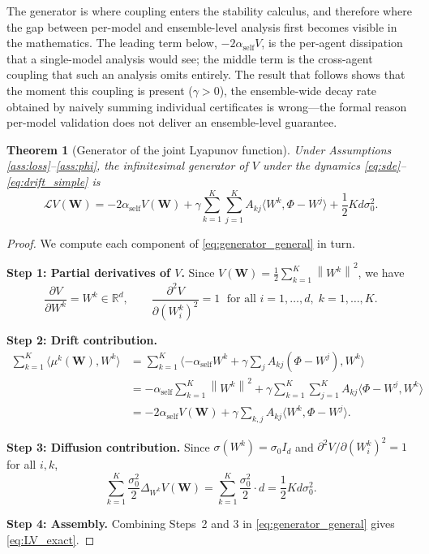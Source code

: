\documentclass[12pt]{article}
\theoremstyle{plain}
\newtheorem{theorem}{Theorem}[section]
\theoremstyle{definition}
\newcommand{\R}{\mathbb{R}}
\newcommand{\Lgen}{\mathcal{L}}
\newcommand{\W}{\mathbf{W}}
\newcommand{\norm}[1]{\left\lVert #1 \right\rVert}
\newcommand{\ip}[2]{\langle #1, #2 \rangle}
\begin{document}
The generator is where coupling enters the stability calculus, and therefore where the gap between per-model and ensemble-level analysis first becomes visible in the mathematics. The leading term below, $-2\alpha_{\mathrm{self}}V$, is the per-agent dissipation that a single-model analysis would see; the middle term is the cross-agent coupling that such an analysis omits entirely. The result that follows shows that the moment this coupling is present ($\gamma>0$), the ensemble-wide decay rate obtained by naively summing individual certificates is wrong---the formal reason per-model validation does not deliver an ensemble-level guarantee.

\begin{theorem}[Generator of the joint Lyapunov function]
  \label{thm:generator}
  Under Assumptions \ref{ass:loss}--\ref{ass:phi}, the infinitesimal
  generator of $V$ under the dynamics \eqref{eq:sde}--\eqref{eq:drift_simple} is
  \begin{equation}
    \Lgen V(\W) = -2\alpha_{\mathrm{self}} V(\W) +
    \gamma \sum_{k=1}^K \sum_{j=1}^K A_{kj}
    \ip{W^k}{\Phi - W^j}
    + \frac{1}{2} K d \sigma_0^2.
    \label{eq:LV_exact}
  \end{equation}
\end{theorem}

\begin{proof}
  We compute each component of \eqref{eq:generator_general} in turn.

  \textbf{Step 1: Partial derivatives of $V$.}
  Since $V(\W) = \tfrac{1}{2}\sum_{k=1}^K \norm{W^k}^2$, we have
  \[
    \frac{\partial V}{\partial W^k} = W^k \in \R^d,
    \qquad
    \frac{\partial^2 V}{\partial (W^k_i)^2} = 1
    \;\text{ for all } i = 1,\ldots,d,\; k = 1,\ldots,K.
  \]

  \textbf{Step 2: Drift contribution.}
  \begin{align*}
    \sum_{k=1}^K \ip{\mu^k(\W)}{W^k}
    &= \sum_{k=1}^K \ip{-\alpha_{\mathrm{self}} W^k
      + \gamma \textstyle\sum_j A_{kj}(\Phi - W^j)}{W^k} \\
    &= -\alpha_{\mathrm{self}} \sum_{k=1}^K \norm{W^k}^2
      + \gamma \sum_{k=1}^K \sum_{j=1}^K A_{kj}
        \ip{\Phi - W^j}{W^k} \\
    &= -2\alpha_{\mathrm{self}} V(\W)
      + \gamma \sum_{k,j} A_{kj} \ip{W^k}{\Phi - W^j}.
  \end{align*}

  \textbf{Step 3: Diffusion contribution.}
  Since $\sigma(W^k) = \sigma_0 I_d$ and
  $\partial^2 V / \partial (W^k_i)^2 = 1$ for all $i, k$,
  \[
    \sum_{k=1}^K \frac{\sigma_0^2}{2} \Delta_{W^k} V(\W)
    = \sum_{k=1}^K \frac{\sigma_0^2}{2} \cdot d
    = \frac{1}{2} K d \sigma_0^2.
  \]

  \textbf{Step 4: Assembly.}
  Combining Steps~2 and 3 in \eqref{eq:generator_general} gives
  \eqref{eq:LV_exact}.
\end{proof}
\end{document}
